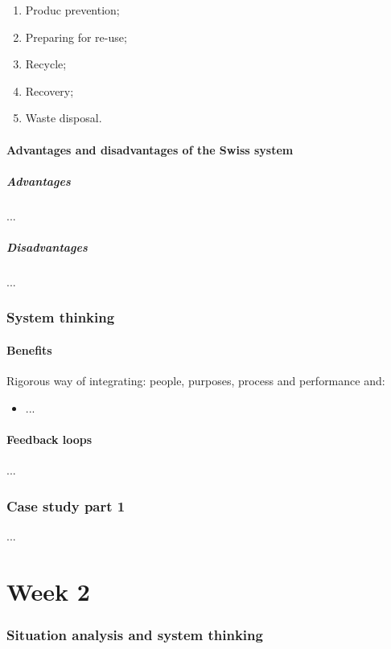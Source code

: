 \documentclass{article}
\begin{document}
\begin{enumerate}
    \item Produc prevention;
    \item Preparing for re-use;
    \item Recycle;
    \item Recovery;
    \item Waste disposal.
\end{enumerate}

\subsection{Advantages and disadvantages of the Swiss system}
\subsubsection{Advantages}
...

\subsubsection{Disadvantages}
...

\section{System thinking}
\subsection{Benefits}
Rigorous way of integrating: people, purposes, process and performance and:
\begin{itemize}
    \item ...
\end{itemize}

\subsection{Feedback loops}
...

\section{Case study part 1}
...

\part{Week 2}
\section{Situation analysis and system thinking}
\end{document}
